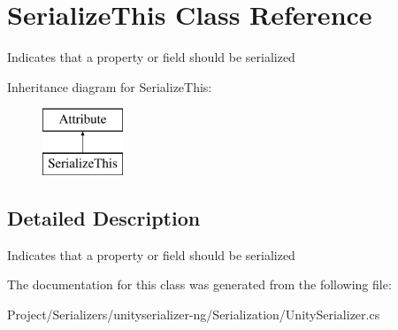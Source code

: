 \hypertarget{class_serialize_this}{}\section{Serialize\+This Class Reference}
\label{class_serialize_this}


Indicates that a property or field should be serialized  


Inheritance diagram for Serialize\+This\+:\begin{figure}[H]
\begin{center}
\leavevmode
\includegraphics[height=2.000000cm]{class_serialize_this}
\end{center}
\end{figure}


\subsection{Detailed Description}
Indicates that a property or field should be serialized 



The documentation for this class was generated from the following file\+:\begin{DoxyCompactItemize}
\item 
Project/\+Serializers/unityserializer-\/ng/\+Serialization/Unity\+Serializer.\+cs\end{DoxyCompactItemize}
